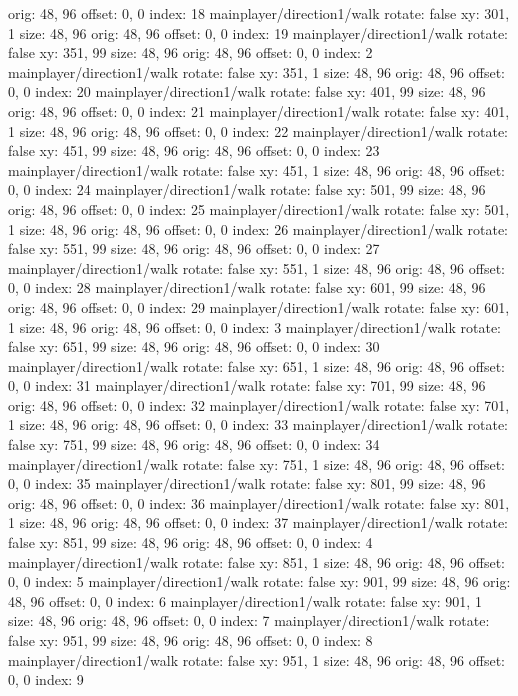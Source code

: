   orig: 48, 96
  offset: 0, 0
  index: 18
mainplayer/direction1/walk
  rotate: false
  xy: 301, 1
  size: 48, 96
  orig: 48, 96
  offset: 0, 0
  index: 19
mainplayer/direction1/walk
  rotate: false
  xy: 351, 99
  size: 48, 96
  orig: 48, 96
  offset: 0, 0
  index: 2
mainplayer/direction1/walk
  rotate: false
  xy: 351, 1
  size: 48, 96
  orig: 48, 96
  offset: 0, 0
  index: 20
mainplayer/direction1/walk
  rotate: false
  xy: 401, 99
  size: 48, 96
  orig: 48, 96
  offset: 0, 0
  index: 21
mainplayer/direction1/walk
  rotate: false
  xy: 401, 1
  size: 48, 96
  orig: 48, 96
  offset: 0, 0
  index: 22
mainplayer/direction1/walk
  rotate: false
  xy: 451, 99
  size: 48, 96
  orig: 48, 96
  offset: 0, 0
  index: 23
mainplayer/direction1/walk
  rotate: false
  xy: 451, 1
  size: 48, 96
  orig: 48, 96
  offset: 0, 0
  index: 24
mainplayer/direction1/walk
  rotate: false
  xy: 501, 99
  size: 48, 96
  orig: 48, 96
  offset: 0, 0
  index: 25
mainplayer/direction1/walk
  rotate: false
  xy: 501, 1
  size: 48, 96
  orig: 48, 96
  offset: 0, 0
  index: 26
mainplayer/direction1/walk
  rotate: false
  xy: 551, 99
  size: 48, 96
  orig: 48, 96
  offset: 0, 0
  index: 27
mainplayer/direction1/walk
  rotate: false
  xy: 551, 1
  size: 48, 96
  orig: 48, 96
  offset: 0, 0
  index: 28
mainplayer/direction1/walk
  rotate: false
  xy: 601, 99
  size: 48, 96
  orig: 48, 96
  offset: 0, 0
  index: 29
mainplayer/direction1/walk
  rotate: false
  xy: 601, 1
  size: 48, 96
  orig: 48, 96
  offset: 0, 0
  index: 3
mainplayer/direction1/walk
  rotate: false
  xy: 651, 99
  size: 48, 96
  orig: 48, 96
  offset: 0, 0
  index: 30
mainplayer/direction1/walk
  rotate: false
  xy: 651, 1
  size: 48, 96
  orig: 48, 96
  offset: 0, 0
  index: 31
mainplayer/direction1/walk
  rotate: false
  xy: 701, 99
  size: 48, 96
  orig: 48, 96
  offset: 0, 0
  index: 32
mainplayer/direction1/walk
  rotate: false
  xy: 701, 1
  size: 48, 96
  orig: 48, 96
  offset: 0, 0
  index: 33
mainplayer/direction1/walk
  rotate: false
  xy: 751, 99
  size: 48, 96
  orig: 48, 96
  offset: 0, 0
  index: 34
mainplayer/direction1/walk
  rotate: false
  xy: 751, 1
  size: 48, 96
  orig: 48, 96
  offset: 0, 0
  index: 35
mainplayer/direction1/walk
  rotate: false
  xy: 801, 99
  size: 48, 96
  orig: 48, 96
  offset: 0, 0
  index: 36
mainplayer/direction1/walk
  rotate: false
  xy: 801, 1
  size: 48, 96
  orig: 48, 96
  offset: 0, 0
  index: 37
mainplayer/direction1/walk
  rotate: false
  xy: 851, 99
  size: 48, 96
  orig: 48, 96
  offset: 0, 0
  index: 4
mainplayer/direction1/walk
  rotate: false
  xy: 851, 1
  size: 48, 96
  orig: 48, 96
  offset: 0, 0
  index: 5
mainplayer/direction1/walk
  rotate: false
  xy: 901, 99
  size: 48, 96
  orig: 48, 96
  offset: 0, 0
  index: 6
mainplayer/direction1/walk
  rotate: false
  xy: 901, 1
  size: 48, 96
  orig: 48, 96
  offset: 0, 0
  index: 7
mainplayer/direction1/walk
  rotate: false
  xy: 951, 99
  size: 48, 96
  orig: 48, 96
  offset: 0, 0
  index: 8
mainplayer/direction1/walk
  rotate: false
  xy: 951, 1
  size: 48, 96
  orig: 48, 96
  offset: 0, 0
  index: 9

